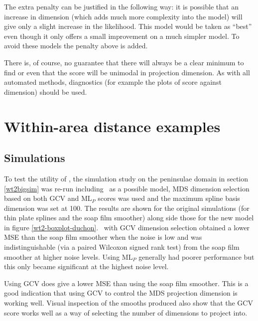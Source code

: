 The extra penalty can be justified in the following way: it is possible that an increase in dimension (which adds much more complexity into the model) will give only a slight increase in the likelihood. This model would be taken as ``best'' even though it only offers a small improvement on a much simpler model. To avoid these models the penalty above is added.

There is, of course, no guarantee that there will always be a clear minimum to find or even that the score will be unimodal in projection dimension. As with all automated methods, diagnostics (for example the plots of score against dimension) should be used.

\section{Within-area distance examples}
\label{gds-wad-examples}
\subsection{Simulations}

To test the utility of \mdsds, the simulation study on the peninsulae domain in section \ref{wt2bigsim} was re-run including \mdsds\ as a possible model, MDS dimension selection based on both GCV and $\text{ML}_P$ scores was used and the maximum spline basis dimension was set at 100. The results are shown for the original simulations (for thin plate splines and the soap film smoother) along side those for the new model in figure \ref{wt2-boxplot-duchon}. \mdsds\ with GCV dimension selection obtained a lower MSE than the soap film smoother when the noise is low and was indistinguishable (via a paired Wilcoxon signed rank test) from the soap film smoother at higher noise levels. Using $\text{ML}_P$ generally had poorer performance but this only became significant at the highest noise level.

Using GCV does give a lower MSE than using the soap film smoother. This is a good indication that using GCV to control the MDS projection dimension is working well. Visual inspection of the smooths produced also show that the GCV score works well as a way of selecting the number of dimensions to project into.

